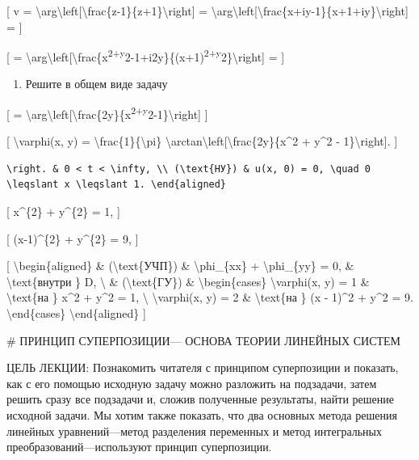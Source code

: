 \documentclass[
]{article}
\providecommand{\tightlist}{%
  \setlength{\itemsep}{0pt}\setlength{\parskip}{0pt}}
\begin{document}
{[} v =
\textbackslash arg\textbackslash left{[}\textbackslash frac\{z-1\}\{z+1\}\textbackslash right{]}
=
\textbackslash arg\textbackslash left{[}\textbackslash frac\{x+iy-1\}\{x+1+iy\}\textbackslash right{]}
= {]}

{[} =
\textbackslash arg\textbackslash left{[}\textbackslash frac\{x\textsuperscript{2+y}2-1+i2y\}\{(x+1)\textsuperscript{2+y}2\}\textbackslash right{]}
= {]}

\begin{enumerate}
\def\labelenumi{\arabic{enumi}.}
\setcounter{enumi}{1}
\tightlist
\item
  Решите в общем виде задачу
\end{enumerate}

{[} =
\textbackslash arg\textbackslash left{[}\textbackslash frac\{2y\}\{x\textsuperscript{2+y}2-1\}\textbackslash right{]}
{]}

{[} \textbackslash varphi(x, y) =
\textbackslash frac\{1\}\{\textbackslash pi\}
\textbackslash arctan\textbackslash left{[}\textbackslash frac\{2y\}\{x\^{}2
+ y\^{}2 - 1\}\textbackslash right{]}. {]}

\begin{verbatim}
\right. & 0 < t < \infty, \\ (\text{НУ}) & u(x, 0) = 0, \quad 0 \leqslant x \leqslant 1. \end{aligned}
\end{verbatim}

{[} x\^{}\{2\} + y\^{}\{2\} = 1, {]}

{[} (x-1)\^{}\{2\} + y\^{}\{2\} = 9, {]}

{[} \textbackslash begin\{aligned\} \& (\textbackslash text\{УЧП\}) \&
\textbackslash phi\_\{xx\} + \textbackslash phi\_\{yy\} = 0, \&
\textbackslash text\{внутри \} D, \textbackslash{} \&
(\textbackslash text\{ГУ\}) \& \textbackslash begin\{cases\}
\textbackslash varphi(x, y) = 1 \& \textbackslash text\{на \} x\^{}2 +
y\^{}2 = 1, \textbackslash{} \textbackslash varphi(x, y) = 2 \&
\textbackslash text\{на \} (x - 1)\^{}2 + y\^{}2 = 9.
\textbackslash end\{cases\} \textbackslash end\{aligned\} {]}

\# ПРИНЦИП СУПЕРПОЗИЦИИ--- ОСНОВА ТЕОРИИ ЛИНЕЙНЫХ СИСТЕМ

ЦЕЛЬ ЛЕКЦИИ: Познакомить читателя с принципом суперпозиции и показать,
как с его помощью исходную задачу можно разложить на подзадачи, затем
решить сразу все подзадачи и, сложив полученные результаты, найти
решение исходной задачи. Мы хотим также показать, что два основных
метода решения линейных уравнений---метод разделения переменных и метод
интегральных преобразований---используют принцип суперпозиции.
\end{document}
